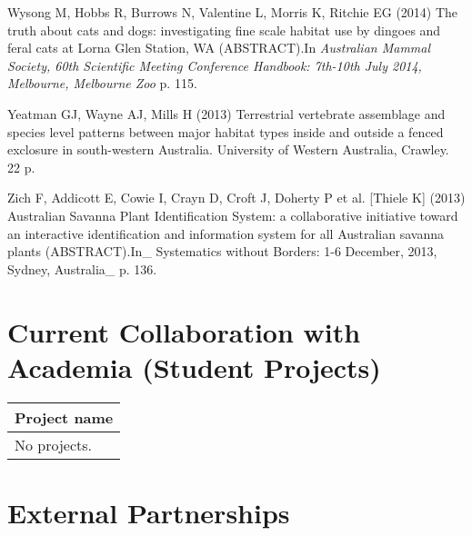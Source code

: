 \documentclass[version=last, paper=a4, DIV=18, usenames, dvipsnames]{scrartcl}
\begin{document}
Wysong M, Hobbs R, Burrows N, Valentine L, Morris K, Ritchie EG (2014) The truth about cats and dogs: investigating fine scale habitat use by dingoes and feral cats at Lorna Glen Station, WA (ABSTRACT).In \emph{Australian Mammal Society, 60th Scientific Meeting Conference Handbook: 7th-10th July 2014, Melbourne, Melbourne Zoo} p. 115.


Yeatman GJ, Wayne AJ, Mills H (2013) Terrestrial vertebrate assemblage and species level patterns between major habitat types inside and outside a fenced exclosure in south-western Australia. University of Western Australia, Crawley. 22 p.


Zich F, Addicott E, Cowie I, Crayn D, Croft J, Doherty P et al. [Thiele K] (2013) Australian Savanna Plant Identification System: a collaborative initiative toward an interactive identification and information system for all Australian savanna plants (ABSTRACT).In_ Systematics without Borders: 1-6 December, 2013, Sydney, Australia_ p. 136.




\clearpage

    
\section{Current Collaboration with Academia (Student Projects)}

\begin{longtabu} to \linewidth { | X |}
\hline
{}
Project name\\
\hline
\endhead

  No projects. \\ \hline

\end{longtabu}

\clearpage

    
\section{External Partnerships}
\end{document}
